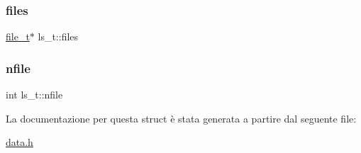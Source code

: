 \subsubsection{\texorpdfstring{files}{files}}
{\footnotesize\ttfamily \hyperlink{structfile__t}{file\+\_\+t}$\ast$ ls\+\_\+t\+::files}

\mbox{\label{structls__t_abb4496e90c61f2a5af018644b8a7441e}} 
\subsubsection{\texorpdfstring{nfile}{nfile}}
{\footnotesize\ttfamily int ls\+\_\+t\+::nfile}



La documentazione per questa struct è stata generata a partire dal seguente file\+:\begin{DoxyCompactItemize}
\item 
\hyperlink{data_8h}{data.\+h}\end{DoxyCompactItemize}

